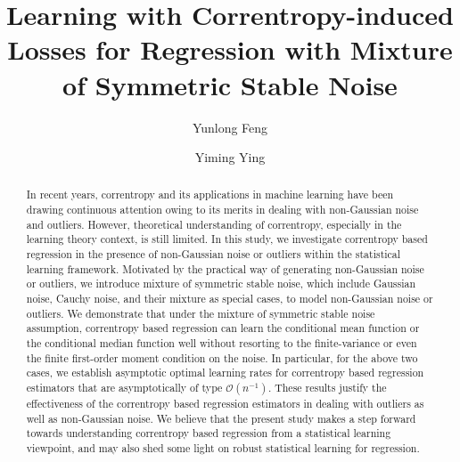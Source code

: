 \documentclass[11pt]{article}
\title{Learning with Correntropy-induced Losses for Regression with Mixture of Symmetric Stable Noise}
\author[]{Yunlong Feng}
\author[]{Yiming Ying}
\affil[]{Department of Mathematics and Statistics,	State University of New York at Albany, New York, USA}
\date{}
\begin{document}
\maketitle

\begin{abstract}
\hspace{-0.5cm}In recent years, correntropy and its applications in machine learning have been drawing continuous attention owing to its merits in dealing with non-Gaussian noise and outliers. However, theoretical understanding of correntropy, especially in the learning theory context, is still limited. In this study, we investigate correntropy based regression in the presence of non-Gaussian noise or outliers within the statistical learning framework. Motivated by the practical way of generating non-Gaussian noise or outliers, we introduce mixture of symmetric stable noise, which include Gaussian noise, Cauchy noise, and their mixture as special cases, to model non-Gaussian noise or outliers. We demonstrate that under the mixture of symmetric stable noise assumption, correntropy based regression can learn the conditional mean function or the conditional median function well without resorting to the finite-variance or even the finite first-order moment condition on the noise. In particular, for the above two cases, we establish asymptotic optimal learning rates for correntropy based regression estimators that are asymptotically of type $\mathcal{O}(n^{-1})$. These results justify the effectiveness of the correntropy based regression estimators in dealing with outliers as well as non-Gaussian noise. We believe that the present study makes a step forward towards understanding correntropy based regression from a statistical learning viewpoint, and may also shed some light on robust statistical learning for regression.    
\end{abstract}

 
\end{document}
